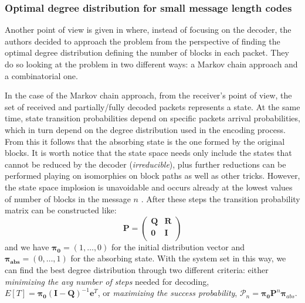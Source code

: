 \subsubsection{Optimal degree distribution for small message length codes}
Another point of view is given in \cite{Hyytia2007} where, instead of focusing on the decoder, the authors decided to approach the problem from the perspective of finding the optimal degree distribution defining the number of blocks in each packet. They do so looking at the problem in two different ways: a Markov chain approach and a combinatorial one.

In the case of the Markov chain approach, from the receiver's point of view, the set of received and partially/fully decoded packets represents a state. At the same time, state transition probabilities depend on specific packets arrival probabilities, which in turn depend on the degree distribution used in the encoding process. From this it follows that the absorbing state is the one formed by the original blocks. It is worth notice that the state space needs only include the states that cannot be reduced by the decoder (\textit{irreducible}), plus further reductions can be performed playing on isomorphies on block paths as well as other tricks. However, the state space implosion is unavoidable and occurs already at the lowest values of number of blocks in the message $n$ \cite{Hyytia2007}. After these steps the transition probability matrix can be constructed like:
\begin{equation}
  \textbf{P} =
  \begin{pmatrix}
    \boldsymbol{Q} & \boldsymbol{R}\\
    \boldsymbol{0} & \boldsymbol{I}\\
  \end{pmatrix}
\end{equation}
and we have $\boldsymbol{\pi_0} = (1,\dots,0)$ for the initial distribution vector and $\boldsymbol{\pi_{abs}} = (0,\dots,1)$ for the absorbing state. With the system set in this way, we can find the best degree distribution through two different criteria: either \textit{minimizing the avg number of steps} needed for decoding, $E[T]=\boldsymbol{\pi_0}(\boldsymbol{I}-\boldsymbol{Q})^{-1}\boldsymbol{e}^T$, or \textit{maximizing the success probability}, $\mathcal{P}_n = \boldsymbol{\pi_0 P}^n\boldsymbol{\pi}_{abs}$.

